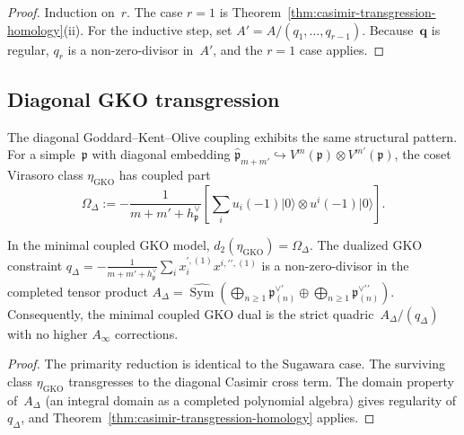 \begin{proof}
Induction on~$r$. The case $r = 1$ is
Theorem~\ref{thm:casimir-transgression-homology}(ii). For the
inductive step, set $A' = A/(q_1, \ldots, q_{r-1})$.
Because~$\mathbf{q}$ is regular, $q_r$ is a non-zero-divisor
in~$A'$, and the $r = 1$ case applies.
\end{proof}

\subsection{Diagonal GKO transgression}
\label{subsec:gko-transgression}

The diagonal Goddard--Kent--Olive coupling exhibits the same
structural pattern. For a simple~$\mathfrak{p}$ with diagonal
embedding
$\widehat{\mathfrak{p}}_{m+m'} \hookrightarrow
V^m(\mathfrak{p}) \otimes V^{m'}(\mathfrak{p})$,
the coset Virasoro class $\eta_{\mathrm{GKO}}$ has coupled part
\[
\Omega_\Delta
:= -\frac{1}{m + m' + h^\vee_\mathfrak{p}}
\left[
 \sum_i u_i(-1)\lvert 0\rangle \otimes u^i(-1)\lvert 0\rangle
\right].
\]

\begin{theorem}
\label{thm:gko-transgression}
In the minimal coupled GKO model,
$d_2(\eta_{\mathrm{GKO}}) = \Omega_\Delta$.
The dualized GKO constraint
$q_\Delta
= -\tfrac{1}{m+m'+h^\vee_\mathfrak{p}}
 \sum_i x_i^{\prime,(1)} x^{i,\prime\prime,(1)}$
is a non-zero-divisor in the completed tensor product
$A_\Delta = \widehat{\operatorname{Sym}}
(\bigoplus_{n \geq 1} \mathfrak{p}^{\vee\prime}_{(n)}
\oplus \bigoplus_{n \geq 1} \mathfrak{p}^{\vee\prime\prime}_{(n)})$.
Consequently, the minimal coupled GKO dual is the strict
quadric~$A_\Delta/(q_\Delta)$ with no higher $A_\infty$
corrections.
\end{theorem}

\begin{proof}
The primarity reduction is identical to the Sugawara case. The
surviving class $\eta_{\mathrm{GKO}}$ transgresses to the diagonal
Casimir cross term. The domain property of~$A_\Delta$ (an integral
domain as a completed polynomial algebra) gives regularity of
$q_\Delta$, and
Theorem~\ref{thm:casimir-transgression-homology} applies.
\end{proof}

